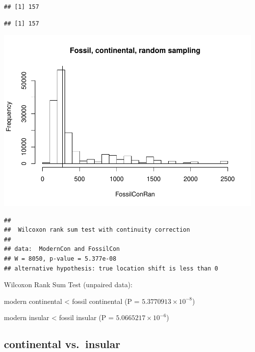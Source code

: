 \documentclass[]{article}
\begin{document}
\begin{verbatim}
## [1] 157
\end{verbatim}

\begin{verbatim}
## [1] 157
\end{verbatim}

\includegraphics{MA_JJ_files/figure-latex/randon sampling modern fossil, island continental-2.pdf}

\begin{verbatim}
## 
##  Wilcoxon rank sum test with continuity correction
## 
## data:  ModernCon and FossilCon
## W = 8050, p-value = 5.377e-08
## alternative hypothesis: true location shift is less than 0
\end{verbatim}

Wilcoxon Rank Sum Test (unpaired data):

modern continental \textless{} fossil continental (P =
\(5.3770913\times 10^{-8}\))

modern insular \textless{} fossil insular (P =
\(5.0665217\times 10^{-6}\))

\newpage

\subsection{continental vs.~insular}\label{continental-vs.insular-1}
\end{document}
